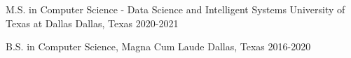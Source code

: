 


\begin{cventries}


\cventry
{M.S. in Computer Science - Data Science and Intelligent Systems} %
{University of Texas at Dallas} %
{Dallas, Texas} %
{2020-2021} %
{}


\cventry
{B.S. in Computer Science, Magna Cum Laude} %
{\hphantom{University of Texas at Dallas}} %
{Dallas, Texas} %
{2016-2020} %
{}


\end{cventries}
